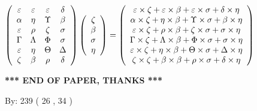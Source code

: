 \documentclass[12pt]{article}
\begin{document}
$  %
 \left( \begin{array}
 {
 c
 c
 c
 c
 }
 \varepsilon & 
 \varepsilon & 
 \varepsilon & 
 \delta \\ 
 \alpha & 
 \eta & 
 \Upsilon & 
 \beta \\ 
 \varepsilon & 
 \rho & 
                    \zeta & 
 \sigma \\ 
 \Gamma & 
 \Lambda & 
 \Phi & 
 \sigma \\ 
 \varepsilon & 
 \eta & 
 \Theta & 
 \Delta \\ 
                    \zeta & 
 \beta & 
 \rho & 
 \delta
 \end{array} \right)
 \left( \begin{array}
 {
 c
 }
                    \zeta \\ 
 \beta \\ 
 \sigma \\ 
 \eta
 \end{array} \right)
=
 \left( \begin{array}
 {
 c
 }
  \varepsilon \times                     \zeta +  \varepsilon \times  \beta +  \varepsilon \times  \sigma +  \delta \times  \eta \\ 
  \alpha \times                     \zeta +  \eta \times  \beta +  \Upsilon \times  \sigma +  \beta \times  \eta \\ 
  \varepsilon \times                     \zeta +  \rho \times  \beta +                     \zeta \times  \sigma +  \sigma \times  \eta \\ 
  \Gamma \times                     \zeta +  \Lambda \times  \beta +  \Phi \times  \sigma +  \sigma \times  \eta \\ 
  \varepsilon \times                     \zeta +  \eta \times  \beta +  \Theta \times  \sigma +  \Delta \times  \eta \\ 
                     \zeta \times                     \zeta +  \beta \times  \beta +  \rho \times  \sigma +  \delta \times  \eta
 \end{array} \right)
$
 
 
 
   
   
 \vspace{0.2in}
 
   
   
   
   
\vspace{1.0in} 
{\textbf{\large{ *** END OF PAPER, THANKS *** }}} 
   
   
\hspace{1.0in} By: 
         239 (          26 ,           34 )
   
\end{document}
